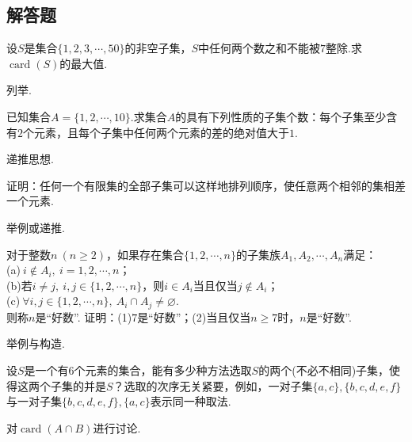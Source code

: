 \documentclass[cn,hazy,black,10pt,normal]{elegantnote}
\DeclareMathOperator{\card}{card}
\begin{document}
\subsection*{解答题}

\begin{problem} %
	设$S$是集合$\{ 1,2,3,\cdots ,50 \}$的非空子集，$S$中任何两个数之和不能被$7$整除.求$\card (S)$的最大值.
\end{problem}
\begin{hint}
	列举.
\end{hint}

\begin{problem} %
	已知集合$A = \{ 1,2, \cdots ,10 \}$.求集合$A$的具有下列性质的子集个数：每个子集至少含有$2$个元素，且每个子集中任何两个元素的差的绝对值大于$1$.
\end{problem}
\begin{hint}
	递推思想.
\end{hint}

\begin{problem} %
	证明：任何一个有限集的全部子集可以这样地排列顺序，使任意两个相邻的集相差一个元素.
\end{problem}
\begin{hint}
	举例或递推.
\end{hint}

\begin{problem} %
	对于整数$n~(n \geq 2)$，如果存在集合$\{ 1,2, \cdots ,n \}$的子集族$A_1,A_2, \cdots ,A_n$满足： \\
	(a)$~i \notin A_i,~i=1,2,\cdots ,n$； \\
	(b)若$i \neq j,~ i,j \in \{ 1,2, \cdots ,n \}$，则$i \in A_i$当且仅当$j \notin A_i$； \\
	(c)$~\forall i,j \in \{ 1,2,\cdots ,n \},~ A_i \cap A_j \neq \varnothing$. \\
	则称$n$是“好数”. 证明：(1)$7$是“好数”；(2)当且仅当$n \geq 7$时，$n$是“好数”.
\end{problem}
\begin{hint}
	举例与构造.
\end{hint}

\begin{problem} %
	设$S$是一个有$6$个元素的集合，能有多少种方法选取$S$的两个(不必不相同)子集，使得这两个子集的并是$S$？选取的次序无关紧要，例如，一对子集$\{ a,c \},\{ b,c,d,e,f \}$与一对子集$\{ b,c,d,e,f \},\{ a,c \}$表示同一种取法.
\end{problem}
\begin{hint}
	对$\card{(A \cap B)}$进行讨论.
\end{hint}
\end{document}
